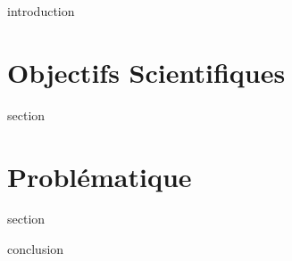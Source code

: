 \chaptertoc{}

\label{sec:2-int}
{introduction}

\section{Objectifs Scientifiques}
\label{sec:2-1}
{section}

\section{Problématique}
\label{sec:2-2}
{section}


\label{sec:2-cnc}
{conclusion}


